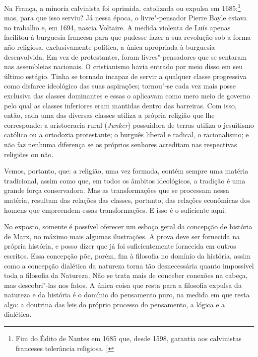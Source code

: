Na França, a minoria calvinista foi oprimida, catolizada ou expulsa em
1685;\footnote{Fim do Édito de
  Nantes em 1685 que, desde 1598, garantia aos calvinistas franceses
  tolerância religiosa. {[}\versal{N.\,T.}{]}} mas, para que isso serviu? Já nessa época, o
livre"-pensador Pierre
Bayle estava no trabalho e, em 1694,
nascia Voltaire.
A medida violenta
de Luís  apenas facilitou à burguesia francesa para que pudesse fazer a sua
revolução sob a forma não religiosa, exclusivamente política, a única
apropriada à burguesia desenvolvida. Em vez de protestantes, foram
livres"-pensadores que se sentaram nas assembleias nacionais. O
cristianismo havia entrado por meio disso em seu último estágio. Tinha
se tornado incapaz de servir a qualquer classe progressiva como disfarce
ideológico das suas aspirações; tornou"-se cada vez mais posse exclusiva
das classes dominantes e essas o aplicavam como mero meio de governo
pelo qual as classes inferiores eram mantidas dentro das barreiras. Com
isso, então, cada uma das diversas classes utiliza a própria religião
que lhe corresponde: a aristocracia rural (\emph{Junker}) possuidora de
terras utiliza o jesuitismo católico ou a ortodoxia protestante; o
burguês liberal e radical, o racionalismo; e não faz nenhuma diferença
se os próprios senhores acreditam nas respectivas religiões ou não.

Vemos, portanto, que: a religião, uma vez formada, contém sempre uma
matéria tradicional, assim como que, em todos os âmbitos ideológicos, a
tradição é uma grande força conservadora. Mas as transformações que se
processam nessa matéria, resultam das relações das classes, portanto,
das relações econômicas dos homens que empreendem essas transformações.
E isso é o suficiente aqui.

No exposto, somente é possível oferecer um esboço geral da concepção de
história de Marx, no máximo mais algumas ilustrações. A prova deve ser
fornecida na própria história, e posso dizer que já foi suficientemente
fornecida em outros escritos. Essa concepção põe, porém, fim à filosofia
no domínio da história, assim como a concepção dialética da natureza
torna tão desnecessária quanto impossível toda a filosofia da Natureza.
Não se trata mais de conceber conexões na cabeça, mas descobri"-las nos
fatos. A única coisa que resta para a filosofia expulsa da natureza e da
história é o domínio do pensamento puro, na medida em que resta algo: a
doutrina das leis do próprio processo do pensamento, a lógica e a
dialética.

\asterisc


